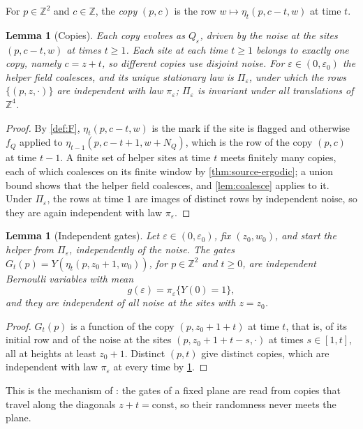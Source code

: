 \documentclass[11pt]{article}
\theoremstyle{plain}
\newtheorem{lemma}[theorem]{Lemma}
\theoremstyle{definition}
\theoremstyle{remark}
\newcommand{\Z}{\mathbb Z}
\newcommand{\eps}{\varepsilon}
\begin{document}
For $p\in\Z^2$ and $c\in\Z$, the \emph{copy} $(p,c)$ is the row $w\mapsto\eta_t(p,c-t,w)$ at time $t$.

\begin{lemma}[Copies]\label{lem:copies}
Each copy evolves as $Q_\eps$, driven by the noise at the sites $(p,c-t,w)$ at times $t\ge1$. Each site at each time $t\ge1$ belongs to exactly one copy, namely $c=z+t$, so different copies use disjoint noise. For $\eps\in(0,\eps_0)$ the helper field coalesces, and its unique stationary law is $\Pi_\eps$, under which the rows $\{(p,z,\cdot)\}$ are independent with law $\pi_\eps$; $\Pi_\eps$ is invariant under all translations of $\Z^4$.
\end{lemma}

\begin{proof}
By \cref{def:F}, $\eta_t(p,c-t,w)$ is the mark if the site is flagged and otherwise $f_Q$ applied to $\eta_{t-1}(p,c-t+1,w+N_Q)$, which is the row of the copy $(p,c)$ at time $t-1$. A finite set of helper sites at time $t$ meets finitely many copies, each of which coalesces on its finite window by \cref{thm:source-ergodic}; a union bound shows that the helper field coalesces, and \cref{lem:coalesce} applies to it. Under $\Pi_\eps$, the rows at time $1$ are images of distinct rows by independent noise, so they are again independent with law $\pi_\eps$.
\end{proof}

\begin{lemma}[Independent gates]\label{lem:gates}
Let $\eps\in(0,\eps_0)$, fix $(z_0,w_0)$, and start the helper from $\Pi_\eps$, independently of the noise. The \emph{gates} $G_t(p)=Y(\eta_t(p,z_0+1,w_0))$, for $p\in\Z^2$ and $t\ge0$, are independent Bernoulli variables with mean
\[
g(\eps)=\pi_\eps\{Y(0)=1\},
\]
and they are independent of all noise at the sites with $z=z_0$.
\end{lemma}

\begin{proof}
$G_t(p)$ is a function of the copy $(p,z_0+1+t)$ at time $t$, that is, of its initial row and of the noise at the sites $(p,z_0+1+t-s,\cdot)$ at times $s\in[1,t]$, all at heights at least $z_0+1$. Distinct $(p,t)$ give distinct copies, which are independent with law $\pi_\eps$ at every time by \cref{lem:copies}.
\end{proof}

This is the mechanism of \cite{DMnil}: the gates of a fixed plane are read from copies that travel along the diagonals $z+t=\mathrm{const}$, so their randomness never meets the plane.
\end{document}
